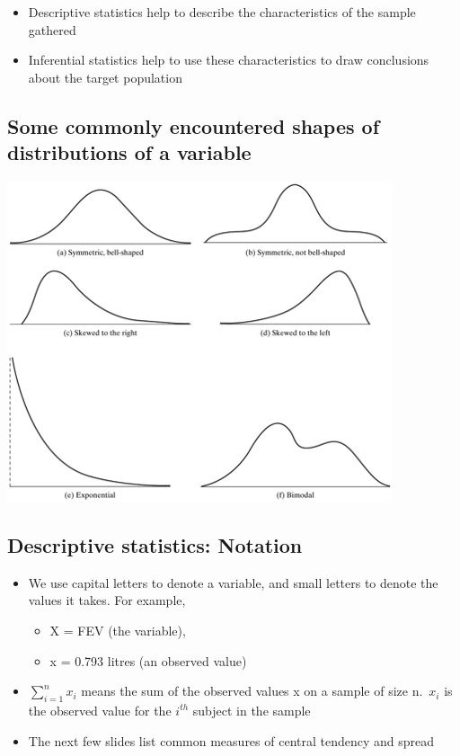\documentclass[
]{book}
\providecommand{\tightlist}{%
  \setlength{\itemsep}{0pt}\setlength{\parskip}{0pt}}
\begin{document}
\begin{itemize}
\tightlist
\item
  Descriptive statistics help to describe the characteristics of the sample gathered
\item
  Inferential statistics help to use these characteristics to draw conclusions about the target population
\end{itemize}

\hypertarget{some-commonly-encountered-shapes-of-distributions-of-a-variable}{%
\subsection{Some commonly encountered shapes of distributions of a variable}\label{some-commonly-encountered-shapes-of-distributions-of-a-variable}}

\includegraphics[width=0.5\linewidth]{./3_4}

\hypertarget{descriptive-statistics-notation}{%
\subsection{Descriptive statistics: Notation}\label{descriptive-statistics-notation}}

\begin{itemize}
\tightlist
\item
  We use capital letters to denote a variable, and small letters to denote the values it takes. For example,

  \begin{itemize}
  \tightlist
  \item
    X = FEV (the variable),
  \item
    x = 0.793 litres (an observed value)
  \end{itemize}
\item
  \(\sum_{i=1}^nx_i\) means the sum of the observed values x on a sample of size n.~\(x_i\) is the observed value for the \(i^{th}\) subject in the sample
\item
  The next few slides list common measures of central tendency and spread
\end{itemize}
\end{document}
